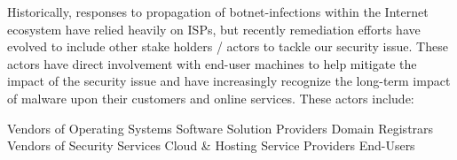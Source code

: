 Historically, responses to propagation of botnet-infections within the Internet ecosystem have relied heavily on ISPs, but recently remediation efforts have evolved to include other stake holders / actors to tackle our security issue. These actors have direct involvement with end-user machines to help mitigate the impact of the security issue and have increasingly recognize the long-term impact of malware upon their customers and online services. These actors include: 

Vendors of Operating Systems
Software Solution Providers
Domain Registrars
Vendors of Security Services
Cloud & Hosting Service Providers
End-Users
